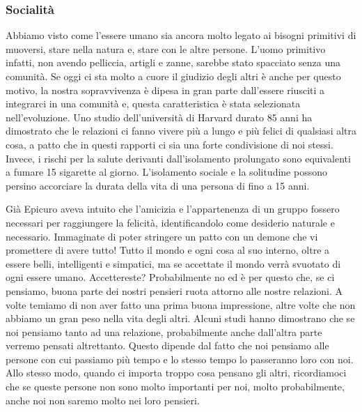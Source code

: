 \documentclass[12pt]{book} %
\begin{document}
\bigskip

\subsubsection{Socialità}
Abbiamo visto come l'essere umano sia ancora molto legato ai bisogni primitivi di muoversi, stare nella natura e, stare con
le altre persone. L'uomo primitivo infatti, non avendo pelliccia, artigli e zanne, sarebbe stato
spacciato senza una comunità. Se oggi ci sta molto a cuore il giudizio degli altri è anche per questo motivo, la nostra
sopravvivenza è dipesa in gran parte dall'essere riusciti a integrarci in una comunità e, questa caratteristica è stata selezionata nell'evoluzione. 
Uno studio dell'università di Harvard durato 85 anni ha dimostrato che le relazioni ci fanno vivere più a lungo e più felici di qualsiasi altra cosa, a patto che in questi rapporti ci sia una forte condivisione di noi stessi.
Invece, i rischi per la salute derivanti dall’isolamento prolungato sono equivalenti a fumare 15 sigarette al giorno. L’isolamento sociale e la solitudine possono persino accorciare la durata della vita di una persona di fino a 15 anni.

Già Epicuro aveva intuito che l'amicizia e l'appartenenza di un gruppo fossero
necessari per raggiungere la felicità, identificandolo come desiderio naturale e necessario. 
Immaginate di poter stringere un patto con un demone che vi promettere di avere tutto! Tutto il mondo e ogni cosa al suo interno,
oltre a essere belli, intelligenti e simpatici, ma se accettate il mondo verrà svuotato di ogni essere umano.
Accettereste? Probabilmente no ed è per questo che, se ci pensiamo, buona parte dei nostri pensieri ruota attorno alle nostre relazioni.
A volte temiamo di non aver fatto una prima buona impressione, altre volte che non abbiamo un gran peso nella vita
degli altri. Alcuni studi hanno dimostrano che se noi pensiamo tanto ad una relazione, probabilmente anche
dall'altra parte verremo pensati altrettanto. Questo dipende dal fatto che noi pensiamo alle persone
con cui passiamo più tempo e lo stesso tempo lo passeranno loro con noi. Allo stesso modo, quando ci importa troppo
cosa pensano gli altri, ricordiamoci che se queste persone non sono molto importanti per noi, molto probabilmente,
anche noi non saremo molto nei loro pensieri.
\end{document}
